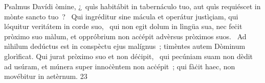 { Psalmus Davídi}
{%
òmine, ¿~quìs habitábit in tabernáculo tuo, aut quìs requiéscet in mònte sancto tuo~?
~Qui ingréditur sine mácula et operátur justìçiam, qui lóquitur veritátem in corde suo,
~qui non egit dolum in lìngüa sua, nec feċit pròximo suo màlum, et oppróbrium non acċépit advèrsus pròximos suos.
~Ad nìhilum dedúctus est in conspèctu ejus malígnus~; timèntes autem Dòminum glorìficat. Qui jurat pròximo suo et non déċipit,
~qui pecúniam suam non dèdit ad usúram, et múnera super innoċèntem non acċépit~; qui fàċit haec, non movébitur in aetèrnum.
}
{2}{3}
